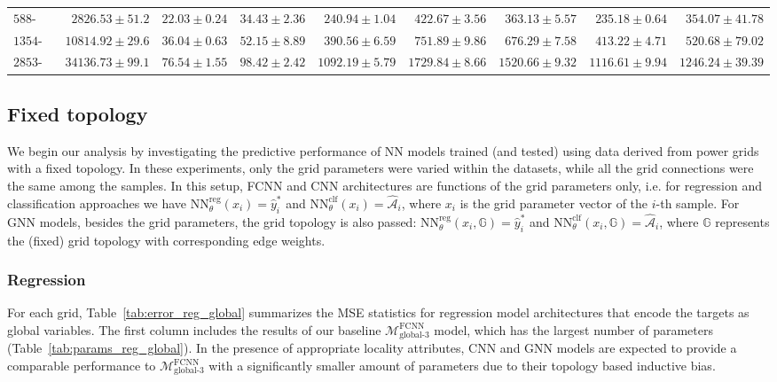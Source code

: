 \documentclass[journal]{IEEEtran}
\begin{document}
\begin{table*}[!ht]
{\begin{tabular}{lr|rrrrrrr}
    $\textrm{588-sdet}$ & $2826.53 \pm 51.2$ & $22.03 \pm 0.24$ & $34.43 \pm 2.36$ & $240.94 \pm 1.04$ & $422.67 \pm 3.56$ & $363.13 \pm 5.57$ & $235.18 \pm 0.64$ & $354.07 \pm 41.78$ \\
    $\textrm{1354-pegase}$ & $10814.92 \pm 29.6$ & $36.04 \pm 0.63$ & $52.15 \pm 8.89$ & $390.56 \pm 6.59$ & $751.89 \pm 9.86$ & $676.29 \pm 7.58$ & $413.22 \pm 4.71$ & $520.68 \pm 79.02$ \\
    $\textrm{2853-sdet}$ & $34136.73 \pm 99.1$ & $76.54 \pm 1.55$ & $98.42 \pm 2.42$ & $1092.19 \pm 5.79$ & $1729.84 \pm 8.66$ & $1520.66 \pm 9.32$ & $1116.61 \pm 9.94$ & $1246.24 \pm 39.39$ \\
    \bottomrule
    \end{tabular}
    }
\end{table*}

\subsection{Fixed topology}
We begin our analysis by investigating the predictive performance of NN models trained (and tested) using data derived from power grids with a fixed topology. In these experiments, only the grid parameters were varied within the datasets, while all the grid connections were the same among the samples. 
In this setup, FCNN and CNN architectures are functions of the grid parameters only, i.e. for regression and classification approaches we have $\mathrm{NN}_{\theta}^{\mathrm{reg}}(x_{i}) = \hat{y}_{i}^{*}$ and $\mathrm{NN}_{\theta}^{\mathrm{clf}}(x_{i}) = \hat{\mathcal{A}}_{i}$, where $x_{i}$ is the grid parameter vector of the $i$-th sample.
For GNN models, besides the grid parameters, the grid topology is also passed: $\mathrm{NN}_{\theta}^{\mathrm{reg}}(x_{i}, \mathbb{G}) = \hat{y}_{i}^{*}$ and $\mathrm{NN}_{\theta}^{\mathrm{clf}}(x_{i}, \mathbb{G}) = \hat{\mathcal{A}}_{i}$, where $\mathbb{G}$ represents the (fixed) grid topology with corresponding edge weights.

\subsubsection{Regression}
For each grid, Table~\ref{tab:error_reg_global} summarizes the MSE statistics for regression model architectures that encode the targets as global variables.
The first column includes the results of our baseline $\mathcal{M}^{\textrm{FCNN}}_{\textrm{global-3}}$ model, which has the largest number of parameters (Table~\ref{tab:params_reg_global}).
In the presence of appropriate locality attributes, CNN and GNN models are expected to provide a comparable performance to $\mathcal{M}^{\textrm{FCNN}}_{\textrm{global-3}}$ with a significantly smaller amount of parameters due to their topology based inductive bias.
\end{document}
